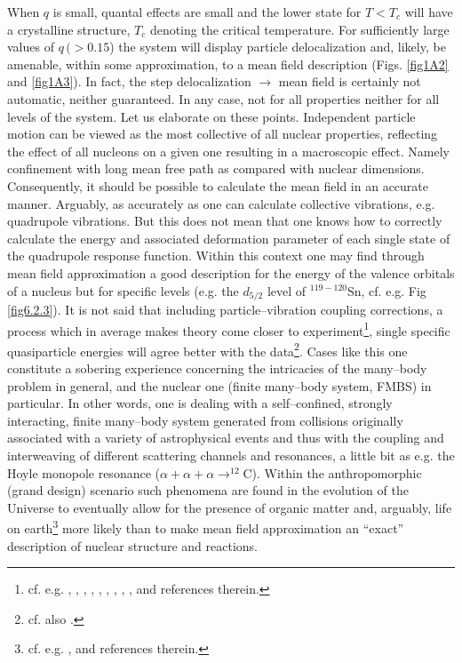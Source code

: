  
  When $q$ is small, quantal effects are small and the lower state for $T<T_c$ will have a crystalline structure, $T_c$ denoting the critical temperature.  For sufficiently large values of $q\, (>0.15$) the system will display particle delocalization and,  likely, be  amenable, within some approximation, to a mean field description (Figs. \ref{fig1A2} and   \ref{fig1A3}). In fact, the step delocalization $\rightarrow$ mean field is certainly not automatic, neither guaranteed. In any case, not for all properties neither for all levels of the system. Let us elaborate on these points. Independent particle motion can be viewed as the most collective of all nuclear properties, reflecting the effect of all nucleons on a given one resulting in a macroscopic effect. Namely confinement with long mean free path as compared with nuclear dimensions. Consequently, it should be possible to calculate the mean field in an accurate manner. Arguably, as accurately as one can calculate collective vibrations, e.g. quadrupole vibrations. But this does not mean that one knows how to correctly calculate the energy and associated deformation parameter of each single state of the quadrupole response function. Within this context one may find through mean field approximation a good description for the energy of the valence orbitals of a nucleus but for  specific levels (e.g. the $d_{5/2}$ level of $^{119-120}$Sn, cf. e.g. Fig \ref{fig6.2.3}). It is not said that  including  particle--vibration coupling corrections, a process which in average makes theory come closer to experiment\footnote{cf. e.g. \cite{Bohr:75}, \cite{Bortignon:77}, \cite{Mahaux:85}, \cite{Bes:71}, \cite{Bes:71b}, \cite{Bes:71c}, \cite{Bortignon:76}, \cite{Bes:88}, \cite{Barranco:87b}, \cite{Barranco:01} and references therein.}, single specific quasiparticle energies will agree better with the data\footnote{cf. also \cite{Tarpanov:14}.}. Cases like this one constitute a sobering experience concerning the intricacies of the many--body problem in general, and the nuclear one (finite many--body system, FMBS) in particular. In other words, one is dealing with a self--confined, strongly interacting, finite many--body system generated from collisions originally associated  with a variety of astrophysical events and thus with  the coupling and interweaving of different scattering channels and resonances, a little bit as e.g. the Hoyle monopole resonance ($\alpha+\alpha+\alpha\rightarrow^{12}$C). Within the anthropomorphic (grand design) scenario such phenomena are found in the evolution of the Universe to eventually allow for the presence of organic matter and, arguably, life on earth\footnote{cf. e.g. \cite{Rees:00}, \cite{Meissner:14} and references therein.} more likely than to make mean field approximation an ``exact'' description of nuclear structure and reactions.
 
